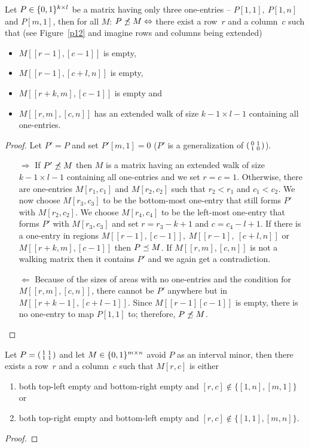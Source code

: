 \begin{thm}
Let $P\in\{0,1\}^{k\times l}$ be a matrix having only three one-entries -- $P[1,1],\ P[1,n]$ and $P[m,1]$, then for all $M$: $P\not\preceq M\Leftrightarrow$ there exist a row~$r$ and a column~$c$ such that (see Figure~\ref{p12} and imagine rows and columns being extended)
\begin{itemize}
\item $M[[r-1],[c-1]]$ is empty,
\item $M[[r-1],[c+l,n]]$ is empty,
\item $M[[r+k,m],[c-1]]$ is empty and
\item $M[[r,m],[c,n]]$ has an extended walk of size $k-1\times l-1$ containing all one-entries.
\end{itemize}
\end{thm}
\begin{proof} Let $P'=P$ and set $P'[m,1]=0$ ($P'$ is a generalization of $\left(\begin{smallmatrix}0&1\\1&0\end{smallmatrix}\right)$). 
\begin{itemize}
\item[$\Rightarrow$] If $P'\not\preceq M$ then $M$ is a matrix having an extended walk of size $k-1\times l-1$ containing all one-entries and we set $r=c=1$. Otherwise, there are one-entries $M[r_1,c_1]$ and $M[r_2,c_2]$ such that $r_2<r_1$ and $c_1<c_2$. We now choose $M[r_3,c_3]$ to be the bottom-most one-entry that still forms $P'$ with $M[r_2,c_2]$. We choose $M[r_4,c_4]$ to be the left-most one-entry that forms $P'$ with $M[r_3,c_3]$ and set $r=r_3-k+1$ and $c=c_4-l+1$. If there is a one-entry in regions $M[[r-1],[c-1]],\ M[[r-1],\ [c+l,n]]$ or $M[[r+k,m],[c-1]]$ then $P\preceq M$. If $M[[r,m],[c,n]]$ is not a walking matrix then it contains $P'$ and we again get a contradiction.
\item[$\Leftarrow$] Because of the sizes of areas with no one-entries and the condition for $M[[r,m],[c,n]]$, there cannot be $P'$ anywhere but in $M[[r+k-1],[c+l-1]]$. Since $M[[r-1][c-1]]$ is empty, there is no one-entry to map $P[1,1]$ to; therefore, $P\not\preceq M$.
\end{itemize}
\end{proof}

\begin{lemma}
\label{lemma1}
Let $P=\left(\begin{smallmatrix}1&1\\1&1\end{smallmatrix}\right)$ and let $M\in\{0,1\}^{m\times n}$ avoid $P$ as an interval minor, then there exists a row~$r$ and a column~$c$ such that $M[r,c]$ is either
\begin{enumerate}
\item both top-left empty and bottom-right empty and $[r,c]\not\in\{[1,n],[m,1]\}$ or
\item both top-right empty and bottom-left empty and $[r,c]\not\in\{[1,1],[m,n]\}$.
\end{enumerate}
\end{lemma}
\begin{proof}

\end{proof}

